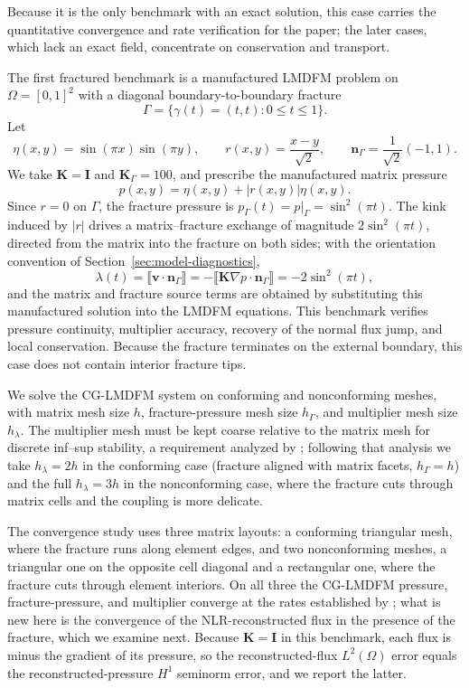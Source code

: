 \documentclass[a4paper,fleqn]{cas-sc}
\newcommand{\jump}[1]{\lBrack #1 \rBrack}
\newcommand{\Kmat}{\mathbf{K}}
\newcommand{\vflux}{\mathbf{v}}
\begin{document}
Because it is the only benchmark with an exact solution, this case carries the
quantitative convergence and rate verification for the paper; the later cases,
which lack an exact field, concentrate on conservation and transport.

The first fractured benchmark is a manufactured LMDFM problem on
\(\Omega=[0,1]^2\) with a diagonal boundary-to-boundary fracture
\[
  \Gamma=\{\gamma(t)=(t,t):0\le t\le 1\}.
\]
Let
\[
\eta(x,y)=\sin(\pi x)\sin(\pi y),\qquad
r(x,y)=\frac{x-y}{\sqrt2},\qquad
\mathbf{n}_\Gamma=\frac{1}{\sqrt2}(-1,1).
\]
We take \(\Kmat=\mathbf{I}\) and \(\Kmat_\Gamma=100\), and prescribe the
manufactured matrix pressure
\[
  p(x,y)=\eta(x,y)+|r(x,y)|\eta(x,y).
\]
Since \(r=0\) on \(\Gamma\), the fracture pressure is
\(p_\Gamma(t)=p|_\Gamma=\sin^2(\pi t)\). The kink induced by \(|r|\) drives a
matrix--fracture exchange of magnitude \(2\sin^2(\pi t)\), directed from the
matrix into the fracture on both sides; with the orientation convention of
Section~\ref{sec:model-diagnostics},
\[
  \lambda(t)=\jump{\vflux\cdot\mathbf{n}_\Gamma}
  =-\jump{\Kmat\nabla p\cdot\mathbf{n}_\Gamma}
  =-2\sin^2(\pi t),
\]
and the matrix and fracture source terms are obtained by substituting this
manufactured solution into the LMDFM equations. This benchmark verifies pressure
continuity, multiplier accuracy, recovery of the normal flux jump, and local
conservation. Because the fracture terminates on the external boundary, this
case does not contain interior fracture tips.

We solve the CG-LMDFM system on conforming and nonconforming meshes, with matrix
mesh size \(h\), fracture-pressure mesh size \(h_\Gamma\), and multiplier mesh
size \(h_\lambda\). The multiplier mesh must be kept coarse relative to the matrix
mesh for discrete inf--sup stability, a requirement analyzed by
\citet{Koeppel2019}; following that analysis we take \(h_\lambda=2h\) in the
conforming case (fracture aligned with matrix facets, \(h_\Gamma=h\)) and the full
\(h_\lambda=3h\) in the nonconforming case, where the fracture cuts through matrix
cells and the coupling is more delicate.

The convergence study uses three matrix layouts: a conforming triangular mesh,
where the fracture runs along element edges, and two nonconforming meshes, a
triangular one on the opposite cell diagonal and a rectangular one, where the
fracture cuts through element interiors. On all three the CG-LMDFM pressure,
fracture-pressure, and multiplier converge at the rates established by
\citet{Koeppel2019}; what is new here is the convergence of the NLR-reconstructed
flux in the presence of the fracture, which we examine next. Because
\(\Kmat=\mathbf{I}\) in this benchmark, each flux is minus the gradient of its
pressure, so the reconstructed-flux \(L^2(\Omega)\) error equals the
reconstructed-pressure \(H^1\) seminorm error, and we report the latter.
\end{document}
